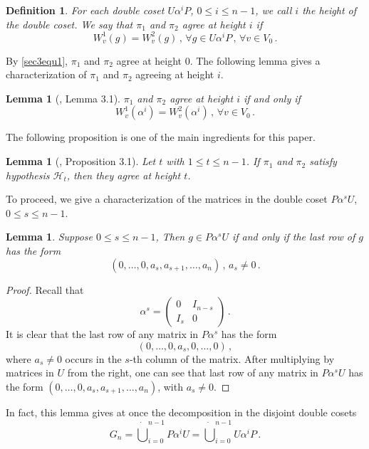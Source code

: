 \documentclass[12pt]{amsart}
\newtheorem{lem}[thm]{Lemma}
\newtheorem{defn}[thm]{Definition}
\begin{document}
\begin{defn}\label{defn}
For each double coset $U \alpha^i P$, $0 \leq i \leq n-1$, we call $i$ the {\it height} of the double coset. We say that $\pi_1$ and $\pi_2$ {\it agree} at height $i$ if 
$$
W^1_v(g)=W^2_v(g)\,,\, \forall g \in U\alpha^i P\,,\, \forall v \in V_0\,.$$
\end{defn}

By \eqref{sec3equ1}, $\pi_1$ and $\pi_2$ agree at height 0.
The following lemma gives a characterization of $\pi_1$ and $\pi_2$ agreeing at height $i$.

\begin{lem}[\cite{Ch06}, Lemma 3.1]\label{lem5}
$\pi_1$ and $\pi_2$ agree at height $i$
if and only if
 $$W^1_v(\alpha^i)=W^2_v(\alpha^i)\,,\, \forall v \in V_0\,.$$
\end{lem} 

The following proposition is one of the main ingredients for this paper. 

\begin{lem}[\cite{Ch06}, Proposition 3.1]\label{lem7}
Let $t$ with $1 \leq t \leq n-1$. If $\pi_1$ and $\pi_2$ satisfy hypothesis ${{\mathcal {H}}}_t$, then
they agree at height $t$. 
\end{lem}

To proceed, we give a characterization of the matrices in the double coset $P \alpha^s U$, $0 \leq s \leq n-1$. 

\begin{lem}\label{lem1}
Suppose $0 \leq s \leq n-1$, Then $g \in P \alpha^s U$ if and only if the last row of $g$ has the form 
$$(0, \ldots, 0, a_{s}, a_{s+1}, \ldots, a_n)\,,\, a_{s} \neq 0\,.$$
\end{lem}

\begin{proof}
Recall that
$$\alpha^{s} = \begin{pmatrix}
0 & I_{n-s}\\
I_{s} & 0
\end{pmatrix}\,.$$
It is clear that the last row of any matrix in $P \alpha^{s}$  has the form 
$$(0, \ldots, 0, a_{s}, 0, \ldots, 0)\,,$$
where $a_s \neq 0$ occurs in the $s$-th column of the matrix.
After multiplying by matrices in $U$ from the right, one can see that  
last row of any matrix in $P \alpha^{s} U$  has the form $(0, \ldots, 0, a_{s}, a_{s+1}, \ldots, a_n)$, with $a_{s} \neq 0$. 
\end{proof}

In fact, this lemma gives at once the decomposition in the disjoint double cosets
\[G_n = \dot\bigcup_{i=0}^{n-1}P \alpha^i U = \dot\bigcup_{i=0}^{n-1}U \alpha^i P\,.\]
\end{document}

